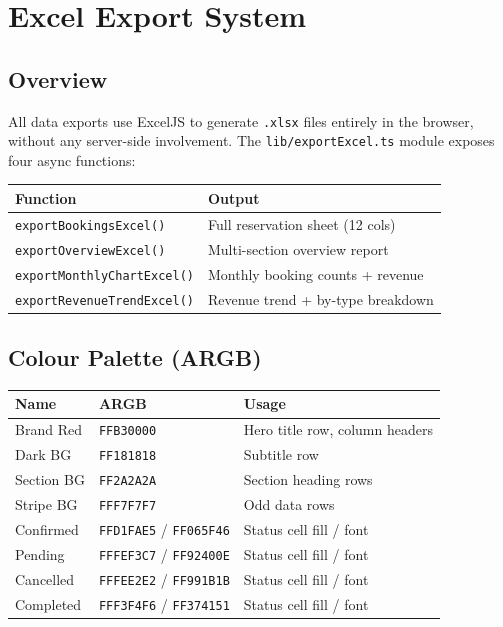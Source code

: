 \documentclass[12pt,a4paper]{report}
\begin{document}
\chapter{Excel Export System}

\section{Overview}

All data exports use ExcelJS to generate \texttt{.xlsx} files entirely in the
browser, without any server-side involvement. The \texttt{lib/exportExcel.ts}
module exposes four async functions:

\begin{center}
\begin{tabular}{ll}
  \toprule
  \textbf{Function} & \textbf{Output} \\
  \midrule
  \texttt{exportBookingsExcel()} & Full reservation sheet (12 cols) \\
  \texttt{exportOverviewExcel()} & Multi-section overview report \\
  \texttt{exportMonthlyChartExcel()} & Monthly booking counts + revenue \\
  \texttt{exportRevenueTrendExcel()} & Revenue trend + by-type breakdown \\
  \bottomrule
\end{tabular}
\end{center}

\section{Colour Palette (ARGB)}

\begin{center}
\begin{tabular}{lll}
  \toprule
  \textbf{Name} & \textbf{ARGB} & \textbf{Usage} \\
  \midrule
  Brand Red     & \texttt{FFB30000} & Hero title row, column headers \\
  Dark BG       & \texttt{FF181818} & Subtitle row \\
  Section BG    & \texttt{FF2A2A2A} & Section heading rows \\
  Stripe BG     & \texttt{FFF7F7F7} & Odd data rows \\
  Confirmed     & \texttt{FFD1FAE5} / \texttt{FF065F46} & Status cell fill / font \\
  Pending       & \texttt{FFFEF3C7} / \texttt{FF92400E} & Status cell fill / font \\
  Cancelled     & \texttt{FFFEE2E2} / \texttt{FF991B1B} & Status cell fill / font \\
  Completed     & \texttt{FFF3F4F6} / \texttt{FF374151} & Status cell fill / font \\
  \bottomrule
\end{tabular}
\end{center}
\end{document}
